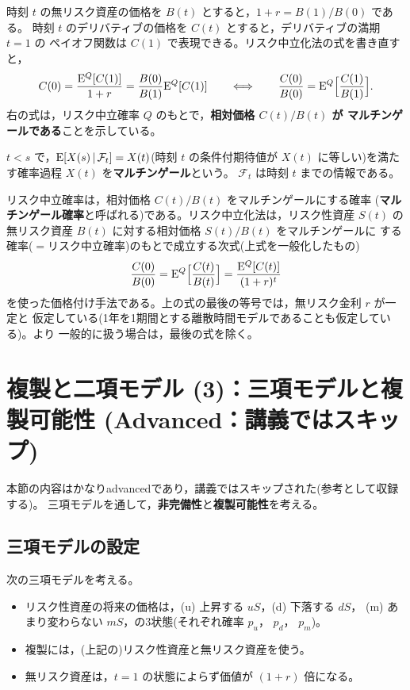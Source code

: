 時刻 $t$ の無リスク資産の価格を $B(t)$ とすると，$1+r = B(1)/B(0)$ である。
時刻 $t$ のデリバティブの価格を $C(t)$ とすると，デリバティブの満期 $t=1$ の
ペイオフ関数は $C(1)$ で表現できる。リスク中立化法の式を書き直すと，
\begin{equation}
C(0) = \frac{\mathrm{E}^Q[C(1)]}{1+r} = \frac{B(0)}{B(1)}\mathrm{E}^Q[C(1)]
\qquad\Longleftrightarrow\qquad
\frac{C(0)}{B(0)} = \mathrm{E}^Q\Bigl[\frac{C(1)}{B(1)}\Bigr].
\end{equation}
右の式は，リスク中立確率 $Q$ のもとで，\textbf{相対価格 $C(t)/B(t)$ が
マルチンゲールである}ことを示している。

\begin{remark}[マルチンゲール]
$t < s$ で，$\mathrm{E}[X(s)\,|\,\mathcal{F}_t] = X(t)$(時刻 $t$ の条件付期待値が
$X(t)$ に等しい)を満たす確率過程 $X(t)$ を\textbf{マルチンゲール}という。
$\mathcal{F}_t$ は時刻 $t$ までの情報である。
\end{remark}

リスク中立確率は，相対価格 $C(t)/B(t)$ をマルチンゲールにする確率
(\textbf{マルチンゲール確率}と呼ばれる)である。リスク中立化法は，リスク性資産
$S(t)$ の無リスク資産 $B(t)$ に対する相対価格 $S(t)/B(t)$ をマルチンゲールに
する確率($=$リスク中立確率)のもとで成立する次式(上式を一般化したもの)
\begin{equation}
\frac{C(0)}{B(0)} = \mathrm{E}^Q\Bigl[\frac{C(t)}{B(t)}\Bigr]
= \frac{\mathrm{E}^Q[C(t)]}{(1+r)^t}
\end{equation}
を使った価格付け手法である。上の式の最後の等号では，無リスク金利 $r$ が一定と
仮定している(1年を1期間とする離散時間モデルであることも仮定している)。より
一般的に扱う場合は，最後の式を除く。

\section{複製と二項モデル (3)：三項モデルと複製可能性
(Advanced：講義ではスキップ)}

本節の内容はかなりadvancedであり，講義ではスキップされた(参考として収録する)。
三項モデルを通して，\textbf{非完備性}と\textbf{複製可能性}を考える。

\subsection{三項モデルの設定}

次の三項モデルを考える。
\begin{itemize}
\item リスク性資産の将来の価格は，(u) 上昇する $uS$，(d) 下落する $dS$，
(m) あまり変わらない $mS$，の3状態(それぞれ確率 $p_u$， $p_d$， $p_m$)。
\item 複製には，(上記の)リスク性資産と無リスク資産を使う。
\item 無リスク資産は，$t=1$ の状態によらず価値が $(1+r)$ 倍になる。
\end{itemize}

